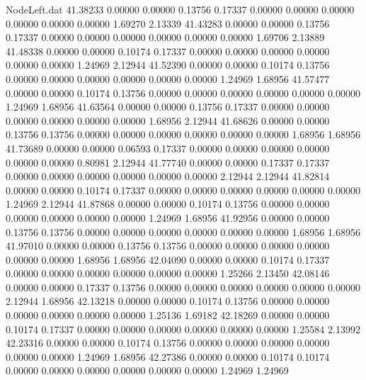 \begin{filecontents}{NodeLeft.dat}
  41.38233    0.00000    0.00000     0.13756    0.17337    0.00000    0.00000    0.00000    0.00000    0.00000    0.00000    1.69270    2.13339
  41.43283    0.00000    0.00000     0.13756    0.17337    0.00000    0.00000    0.00000    0.00000    0.00000    0.00000    1.69706    2.13889
  41.48338    0.00000    0.00000     0.10174    0.17337    0.00000    0.00000    0.00000    0.00000    0.00000    0.00000    1.24969    2.12944
  41.52390    0.00000    0.00000     0.10174    0.13756    0.00000    0.00000    0.00000    0.00000    0.00000    0.00000    1.24969    1.68956
  41.57477    0.00000    0.00000     0.10174    0.13756    0.00000    0.00000    0.00000    0.00000    0.00000    0.00000    1.24969    1.68956
  41.63564    0.00000    0.00000     0.13756    0.17337    0.00000    0.00000    0.00000    0.00000    0.00000    0.00000    1.68956    2.12944
  41.68626    0.00000    0.00000     0.13756    0.13756    0.00000    0.00000    0.00000    0.00000    0.00000    0.00000    1.68956    1.68956
  41.73689    0.00000    0.00000     0.06593    0.17337    0.00000    0.00000    0.00000    0.00000    0.00000    0.00000    0.80981    2.12944
  41.77740    0.00000    0.00000     0.17337    0.17337    0.00000    0.00000    0.00000    0.00000    0.00000    0.00000    2.12944    2.12944
  41.82814    0.00000    0.00000     0.10174    0.17337    0.00000    0.00000    0.00000    0.00000    0.00000    0.00000    1.24969    2.12944
  41.87868    0.00000    0.00000     0.10174    0.13756    0.00000    0.00000    0.00000    0.00000    0.00000    0.00000    1.24969    1.68956
  41.92956    0.00000    0.00000     0.13756    0.13756    0.00000    0.00000    0.00000    0.00000    0.00000    0.00000    1.68956    1.68956
  41.97010    0.00000    0.00000     0.13756    0.13756    0.00000    0.00000    0.00000    0.00000    0.00000    0.00000    1.68956    1.68956
  42.04090    0.00000    0.00000     0.10174    0.17337    0.00000    0.00000    0.00000    0.00000    0.00000    0.00000    1.25266    2.13450
  42.08146    0.00000    0.00000     0.17337    0.13756    0.00000    0.00000    0.00000    0.00000    0.00000    0.00000    2.12944    1.68956
  42.13218    0.00000    0.00000     0.10174    0.13756    0.00000    0.00000    0.00000    0.00000    0.00000    0.00000    1.25136    1.69182
  42.18269    0.00000    0.00000     0.10174    0.17337    0.00000    0.00000    0.00000    0.00000    0.00000    0.00000    1.25584    2.13992
  42.23316    0.00000    0.00000     0.10174    0.13756    0.00000    0.00000    0.00000    0.00000    0.00000    0.00000    1.24969    1.68956
  42.27386    0.00000    0.00000     0.10174    0.10174    0.00000    0.00000    0.00000    0.00000    0.00000    0.00000    1.24969    1.24969

\end{filecontents}
